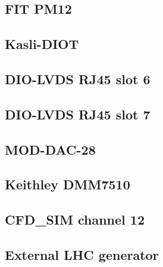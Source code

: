 \subsection*{FIT PM12}
\subsection*{Kasli-DIOT}
\subsection*{DIO-LVDS RJ45 slot 6}
\subsection*{DIO-LVDS RJ45 slot 7}
\subsection*{MOD-DAC-28}
\subsection*{Keithley DMM7510}
\subsection*{CFD\_SIM channel 12}
\subsection*{External LHC generator}
\clearpage
